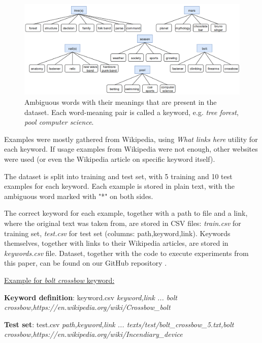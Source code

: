 \documentclass{llncs}
\begin{document}
\begin{figure}
    \centering
    \caption{Ambiguous words with their meanings that are present in the dataset. Each word-meaning pair is called a keyword, e.g. \textit{tree forest}, \textit{pool computer science}.}
    \label{fig:keywords}
    \includegraphics[scale=0.35]{res/keywords.png}
\end{figure}

Examples were mostly gathered from Wikipedia, using \textit{What links here} utility for each keyword.
If usage examples from Wikipedia were not enough, other websites were used (or even the Wikipedia article on specific keyword itself).

The dataset is split into training and test set, with 5 training and 10 test examples for each keyword.
Each example is stored in plain text, with the ambiguous word marked with "*" on both sides.

The correct keyword for each example, together with a path to file and a link, where the original text was taken from, are stored in CSV files: \textit{train.csv} for training set, \textit{test.csv} for test set (columns: path,keyword,link).
Keywords themselves, together with links to their Wikipedia articles, are stored in \textit{keywords.csv} file.
Dataset, together with the code to execute experiments from this paper, can be found on our GitHub repository \cite{repository}.

\bigskip
\underline{Example for \textit{bolt crossbow} keyword:}

\smallskip
\textbf{Keyword definition}: keyword.csv\newline
\textit{
keyword,link\newline
...\newline
bolt crossbow,https://en.wikipedia.org/wiki/Crossbow\_bolt}

\smallskip
\textbf{Test set}: test.csv\newline
\textit{
path,keyword,link\newline
...\newline
texts/test/bolt\_crossbow\_5.txt,bolt crossbow,https://en.wikipedia.org/wiki/Incendiary\_device
}
\end{document}
